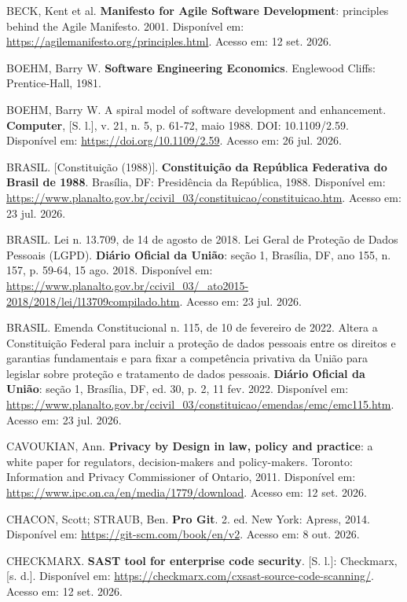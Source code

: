 \documentclass[12pt,a4paper,oneside]{report}
\newcommand{\tituloref}[1]{\textbf{#1}}
\begin{document}
BECK, Kent et al. \tituloref{Manifesto for Agile Software Development}: principles behind the Agile Manifesto. 2001. Disponível em: \url{https://agilemanifesto.org/principles.html}. Acesso em: 12 set. 2026.

BOEHM, Barry W. \tituloref{Software Engineering Economics}. Englewood Cliffs: Prentice-Hall, 1981.

BOEHM, Barry W. A spiral model of software development and enhancement. \tituloref{Computer}, [S. l.], v. 21, n. 5, p. 61-72, maio 1988. DOI: 10.1109/2.59. Disponível em: \url{https://doi.org/10.1109/2.59}. Acesso em: 26 jul. 2026.

BRASIL. [Constituição (1988)]. \tituloref{Constituição da República Federativa do Brasil de 1988}. Brasília, DF: Presidência da República, 1988. Disponível em: \url{https://www.planalto.gov.br/ccivil_03/constituicao/constituicao.htm}. Acesso em: 23 jul. 2026.

BRASIL. Lei n. 13.709, de 14 de agosto de 2018. Lei Geral de Proteção de Dados Pessoais (LGPD). \tituloref{Diário Oficial da União}: seção 1, Brasília, DF, ano 155, n. 157, p. 59-64, 15 ago. 2018. Disponível em: \url{https://www.planalto.gov.br/ccivil_03/_ato2015-2018/2018/lei/l13709compilado.htm}. Acesso em: 23 jul. 2026.

BRASIL. Emenda Constitucional n. 115, de 10 de fevereiro de 2022. Altera a Constituição Federal para incluir a proteção de dados pessoais entre os direitos e garantias fundamentais e para fixar a competência privativa da União para legislar sobre proteção e tratamento de dados pessoais. \tituloref{Diário Oficial da União}: seção 1, Brasília, DF, ed. 30, p. 2, 11 fev. 2022. Disponível em: \url{https://www.planalto.gov.br/ccivil_03/constituicao/emendas/emc/emc115.htm}. Acesso em: 23 jul. 2026.

CAVOUKIAN, Ann. \tituloref{Privacy by Design in law, policy and practice}: a white paper for regulators, decision-makers and policy-makers. Toronto: Information and Privacy Commissioner of Ontario, 2011. Disponível em: \url{https://www.ipc.on.ca/en/media/1779/download}. Acesso em: 12 set. 2026.

CHACON, Scott; STRAUB, Ben. \tituloref{Pro Git}. 2. ed. New York: Apress, 2014. Disponível em: \url{https://git-scm.com/book/en/v2}. Acesso em: 8 out. 2026.

CHECKMARX. \tituloref{SAST tool for enterprise code security}. [S. l.]: Checkmarx, [s. d.]. Disponível em: \url{https://checkmarx.com/cxsast-source-code-scanning/}. Acesso em: 12 set. 2026.
\end{document}
